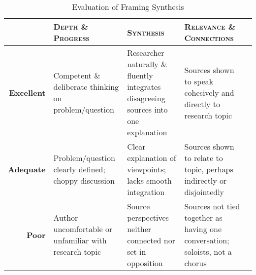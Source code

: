 \documentclass[11pt, twosides]{amsart}	%
\begin{document}
\begin{table}[b]
	\caption{Evaluation of Framing Synthesis}\label{tab:synth-rubric}
\begin{tabulary}{\textwidth}{rLLLL}
	\toprule  & \textbf{\textsc{Depth \& Progress}} & %
	 \textbf{\textsc{Synthesis}} & \textbf{\textsc{Relevance \& Connections}}\\
\midrule	\textbf{Excellent} & Competent \& deliberate thinking on problem/question & Researcher naturally \& fluently integrates disagreeing sources into one explanation & Sources shown to speak cohesively and directly to research topic \\
\midrule	\textbf{Adequate} & Problem/question clearly defined; choppy discussion & Clear explanation of viewpoints; lacks smooth integration & Sources shown to relate to topic, perhaps indirectly or disjointedly \\
\midrule	\textbf{Poor} & Author uncomfortable or unfamiliar with research topic & Source perspectives neither connected nor set in opposition & Sources not tied together as having one conversation; soloists, not a chorus \\
	\bottomrule
\end{tabulary}
\end{table}

\end{document}
